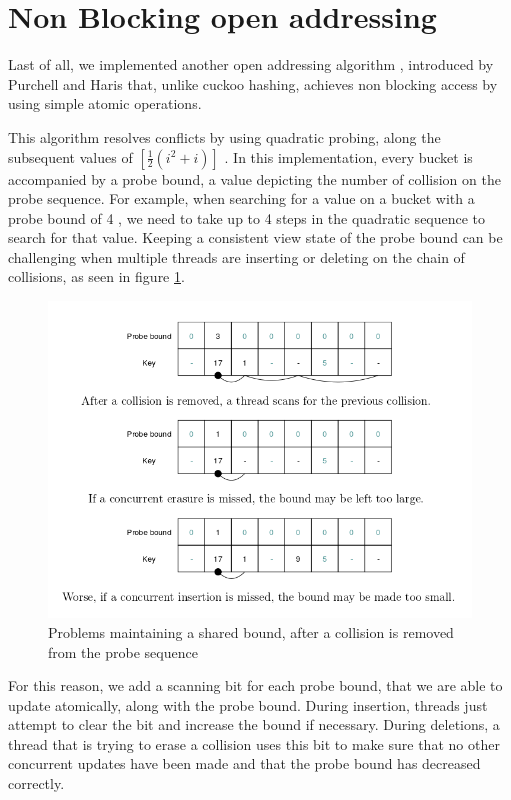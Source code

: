 \section{Non Blocking  open addressing}

Last of all, we implemented another open addressing algorithm , introduced by Purchell and Haris \cite{non_blocking_open_addressing} that, unlike cuckoo hashing,  achieves non blocking access by using simple atomic operations.

This algorithm resolves conflicts by using quadratic probing, along the subsequent values of $\left[ \frac{1}{2}\left(i^2 + i\right)\right]$ . In this implementation, every bucket is accompanied by a probe bound, a value depicting the number of collision on the probe sequence. For example, when searching for a value on a bucket with a probe bound of 4 , we need to take up to 4 steps in the quadratic sequence to search for that value. Keeping a consistent view state of the probe bound can be challenging when multiple threads are inserting or deleting on the chain of collisions, as seen in figure \ref{non_blocking_1}.

\begin{figure}
 \centering
  \includegraphics[scale=0.5]{non_blocking_1.png}
\caption{Problems maintaining a shared bound, after a collision is removed from the probe sequence}
\label{non_blocking_1}
\end{figure}

For this reason, we add a scanning bit for each probe bound, that we are able to update atomically, along with the probe bound. During insertion, threads just attempt to clear the bit and increase the bound if necessary. During deletions, a thread that is trying to erase a collision uses this bit to make sure that no other concurrent  updates have been made and that the probe bound has decreased correctly.

